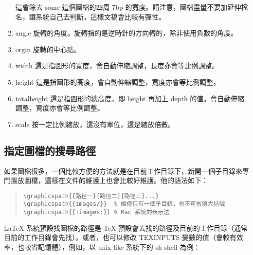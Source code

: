 \begin{enumerate}
        這會除去 {\ttfamily some} 這個圖檔的四周 7bp 的寬度。請注意，圖檔盡量不要加延伸檔名，讓系統自己去判斷，這樣文稿會比較有彈性。

  \item {\ttfamily angle} \newline
        旋轉的角度。旋轉指的是逆時針的方向轉的，除非使用負數的角度。

  \item{\ttfamily orgin} \newline
        旋轉的中心點。

  \item {\ttfamily width} \newline
        這是指圖形的寬度，會自動伸縮調整，長度亦會等比例調整。

  \item {\ttfamily height} \newline
        這是指圖形的高度，會自動伸縮調整，寬度亦會等比例調整。

  \item {\ttfamily totalheight} \newline
        這是指圖形的總高度，即 height 再加上 depth 的值。會自動伸縮調整，寬度亦會等比例調整。

  \item {\ttfamily scale} \newline
        按一定比例縮放，這沒有單位，這是縮放倍數。

\end{enumerate}

\subsection{指定圖檔的搜尋路徑}

如果圖檔很多，一個比較方便的方法就是在目前工作目錄下，新開一個子目錄來專門置放圖檔，這樣在文件的維護上也會比較好維護。他的語法如下：

\begin{quote}
  \begin{verbatim}
\graphicspath{{路徑一}{路徑二}{路徑三}...}
\graphicspath{{images/}}  % 縱使只有一個子目錄，也不可省略大括號
\graphicspath{{:images:}} % Mac 系統的表示法
\end{verbatim}
\end{quote}

\LaTeX{} 系統預設找圖檔的路徑是 \TeX{} 預設會去找的路徑及目前的工作目錄（通常目前的工作目錄會先找）。或者，也可以修改 {\ttfamily TEXINPUTS} 變數的值（會較有效率，也較省記憶體），例如，以 unix-like 系統下的 sh shell 為例：

